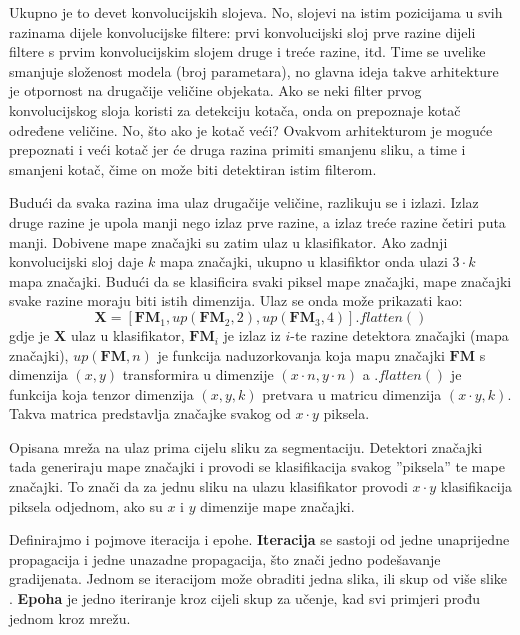 \documentclass[times, utf8, diplomski, numeric]{fer}
\begin{document}
Ukupno je to devet konvolucijskih slojeva. No, slojevi na istim pozicijama u svih razinama dijele konvolucijske filtere: prvi konvolucijski sloj prve razine dijeli filtere s prvim konvolucijskim slojem druge i treće razine, itd. Time se uvelike smanjuje složenost modela (broj parametara), no glavna ideja takve arhitekture je otpornost na drugačije veličine objekata. Ako se neki filter prvog konvolucijskog sloja koristi za detekciju kotača, onda on prepoznaje kotač određene veličine. No, što ako je kotač veći? Ovakvom arhitekturom je moguće prepoznati i veći kotač jer će druga razina primiti smanjenu sliku, a time i smanjeni kotač, čime on može biti detektiran istim filterom.

Budući da svaka razina ima ulaz drugačije veličine, razlikuju se i izlazi. Izlaz druge razine je upola manji nego izlaz prve razine, a izlaz treće razine četiri puta manji. Dobivene mape značajki su zatim ulaz u klasifikator. Ako zadnji konvolucijski sloj daje $k$ mapa značajki, ukupno u klasifiktor onda ulazi $3 \cdot k$ mapa značajki. Budući da se klasificira svaki piksel mape značajki, mape značajki svake razine moraju biti istih dimenzija. Ulaz se onda može prikazati kao:
\begin{equation}
	\boldsymbol{X} = [\boldsymbol{FM}_1, up(\boldsymbol{FM}_2, 2), up(\boldsymbol{FM}_3, 4)].flatten()
\end{equation}
gdje je $\boldsymbol{X}$ ulaz u klasifikator, $\boldsymbol{FM}_i$ je izlaz iz $i$-te razine detektora značajki (mapa značajki), $up(\boldsymbol{FM}, n)$ je funkcija naduzorkovanja koja mapu značajki $\boldsymbol{FM}$ s dimenzija $(x, y)$ transformira u dimenzije $(x \cdot n, y\cdot n)$ a $.flatten()$ je funkcija koja tenzor dimenzija $(x, y, k)$ pretvara u matricu dimenzija $(x \cdot y, k)$. Takva matrica predstavlja značajke svakog od $x \cdot y$ piksela.

Opisana mreža na ulaz prima cijelu sliku za segmentaciju. Detektori značajki tada generiraju mape značajki i provodi se klasifikacija svakog ''piksela'' te mape značajki. To znači da za jednu sliku na ulazu klasifikator provodi $x \cdot y$ klasifikacija piksela odjednom, ako su $x$ i $y$ dimenzije mape značajki.

Definirajmo i pojmove iteracija i epohe. \textbf{Iteracija} se sastoji od jedne unaprijedne propagacija i jedne unazadne propagacija, što znači jedno podešavanje gradijenata. Jednom se iteracijom može obraditi jedna slika, ili skup od više slike . \textbf{Epoha} je jedno iteriranje kroz cijeli skup za učenje, kad svi primjeri prođu jednom kroz mrežu.
\end{document}
